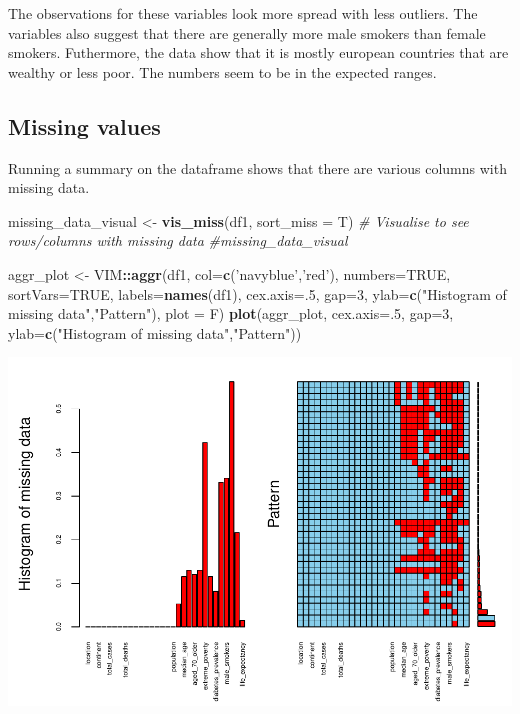 \documentclass[
]{article}
\newenvironment{Shaded}{\begin{snugshade}}{\end{snugshade}}
\newcommand{\CommentTok}[1]{\textcolor[rgb]{0.56,0.35,0.01}{\textit{#1}}}
\newcommand{\DataTypeTok}[1]{\textcolor[rgb]{0.13,0.29,0.53}{#1}}
\newcommand{\DecValTok}[1]{\textcolor[rgb]{0.00,0.00,0.81}{#1}}
\newcommand{\KeywordTok}[1]{\textcolor[rgb]{0.13,0.29,0.53}{\textbf{#1}}}
\newcommand{\NormalTok}[1]{#1}
\newcommand{\OperatorTok}[1]{\textcolor[rgb]{0.81,0.36,0.00}{\textbf{#1}}}
\newcommand{\OtherTok}[1]{\textcolor[rgb]{0.56,0.35,0.01}{#1}}
\newcommand{\StringTok}[1]{\textcolor[rgb]{0.31,0.60,0.02}{#1}}
\begin{document}
The observations for these variables look more spread with less outliers. The variables also suggest that there are generally more male smokers than female smokers. Futhermore, the data show that it is mostly european countries that are wealthy or less poor. The numbers seem to be in the expected ranges.

\hypertarget{missing-values}{%
\subsection{Missing values}\label{missing-values}}

Running a summary on the dataframe shows that there are various columns with missing data.

\begin{Shaded}
\begin{Highlighting}[]
\NormalTok{missing_data_visual <-}\StringTok{ }\KeywordTok{vis_miss}\NormalTok{(df1, }\DataTypeTok{sort_miss =}\NormalTok{ T) }\CommentTok{# Visualise to see rows/columns with missing data}
\CommentTok{#missing_data_visual}

\NormalTok{aggr_plot <-}\StringTok{ }\NormalTok{VIM}\OperatorTok{::}\KeywordTok{aggr}\NormalTok{(df1, }\DataTypeTok{col=}\KeywordTok{c}\NormalTok{(}\StringTok{'navyblue'}\NormalTok{,}\StringTok{'red'}\NormalTok{), }\DataTypeTok{numbers=}\OtherTok{TRUE}\NormalTok{, }\DataTypeTok{sortVars=}\OtherTok{TRUE}\NormalTok{, }\DataTypeTok{labels=}\KeywordTok{names}\NormalTok{(df1), }\DataTypeTok{cex.axis=}\NormalTok{.}\DecValTok{5}\NormalTok{, }\DataTypeTok{gap=}\DecValTok{3}\NormalTok{, }\DataTypeTok{ylab=}\KeywordTok{c}\NormalTok{(}\StringTok{"Histogram of missing data"}\NormalTok{,}\StringTok{"Pattern"}\NormalTok{), }\DataTypeTok{plot =}\NormalTok{ F)}
\KeywordTok{plot}\NormalTok{(aggr_plot, }\DataTypeTok{cex.axis=}\NormalTok{.}\DecValTok{5}\NormalTok{, }\DataTypeTok{gap=}\DecValTok{3}\NormalTok{, }\DataTypeTok{ylab=}\KeywordTok{c}\NormalTok{(}\StringTok{"Histogram of missing data"}\NormalTok{,}\StringTok{"Pattern"}\NormalTok{))}
\end{Highlighting}
\end{Shaded}

\includegraphics{Assignment1_files/figure-latex/missing_data_tab-1.pdf}
\end{document}
